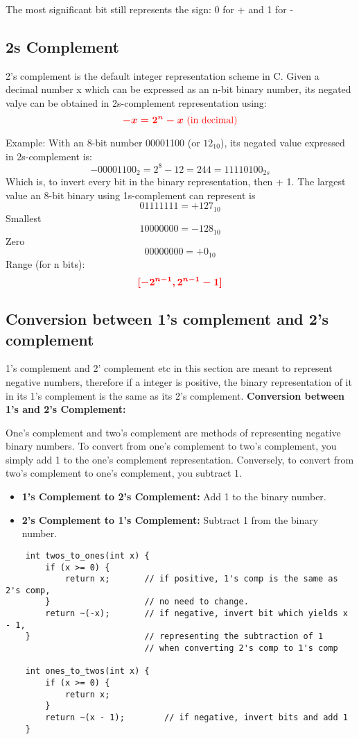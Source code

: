 \documentclass[12pt]{article} %
\begin{document}
The most significant bit still represents the sign: 
0 for + and 
1 for -

\subsection{2s Complement}
2's complement is the default integer representation scheme in C.
Given a decimal number x which can be expressed as an n-bit binary number, its negated valye can be obtained in 2s-complement representation using:
\[
\textcolor{red}{\boldsymbol{-x = 2^n -x \text{ (in decimal)}}}
\]

Example: With an 8-bit number 00001100 (or \(12_{10}\)), its negated value expressed in 2s-complement is:
\[-00001100_2 = 2^8 - 12 = 244 = 11110100_{2s}\]
Which is, to invert every bit in the binary representation, then + 1.
The largest value an 8-bit binary using 1s-complement can represent is 
\[01111111 = +127_{10}\]
Smallest
\[10000000 = -128_{10}\]
Zero
\[00000000 = +0_{10}\]
Range (for n bits): 
\[\textcolor{red}{\boldsymbol{[-2^{n - 1}, 2^{n - 1} - 1]}}\]
\newpage
\subsection{Conversion between 1's complement and 2's complement}
1's complement and 2' complement etc in this section are meant to represent negative numbers, therefore if a integer is positive, the binary representation of it in its 1's complement is the same as its 2's complement.
\textbf{Conversion between 1's and 2's Complement:}

One's complement and two's complement are methods of representing negative binary numbers. To convert from one's complement to two's complement, you simply add 1 to the one's complement representation. Conversely, to convert from two's complement to one's complement, you subtract 1. 

\begin{itemize}
    \item \textbf{1's Complement to 2's Complement:} Add 1 to the binary number.
    \item \textbf{2's Complement to 1's Complement:} Subtract 1 from the binary number.
\end{itemize}
\begin{lstlisting}
    int twos_to_ones(int x) {
        if (x >= 0) {
            return x;       // if positive, 1's comp is the same as 2's comp, 
        }                   // no need to change.
        return ~(-x);       // if negative, invert bit which yields x - 1, 
    }                       // representing the subtraction of 1 
                            // when converting 2's comp to 1's comp

    int ones_to_twos(int x) {
        if (x >= 0) {
            return x;           
        }                       
        return ~(x - 1);        // if negative, invert bits and add 1
    }

\end{lstlisting}
\end{document}
